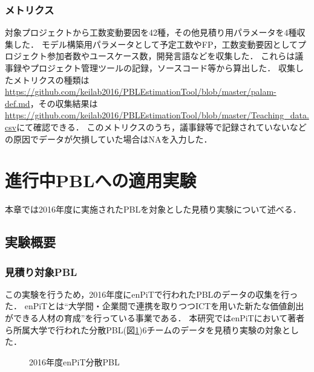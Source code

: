 \documentclass{compsoft}
\begin{document}
\subsubsection{メトリクス} \label{metrix}
対象プロジェクトから工数変動要因を42種，その他見積り用パラメータを4種収集した．
モデル構築用パラメータとして予定工数やFP，工数変動要因としてプロジェクト参加者数やユースケース数，開発言語などを収集した．
これらは議事録やプロジェクト管理ツールの記録，ソースコード等から算出した．
収集したメトリクスの種類は\url{https://github.com/keilab2016/PBLEstimationTool/blob/master/palam-def.md}，その収集結果は\url{https://github.com/keilab2016/PBLEstimationTool/blob/master/Teaching_data.csv}にて確認できる．
このメトリクスのうち，議事録等で記録されていないなどの原因でデータが欠損していた場合はNAを入力した．

\section{進行中PBLへの適用実験} \label{enPiT-PBL}
本章では2016年度に実施されたPBLを対象とした見積り実験について述べる．

\subsection{実験概要} \label{enPiT-exp-summary}

\subsubsection{見積り対象PBL} \label{enPiT-PBL-detail}
この実験を行うため，2016年度にenPiTで行われたPBLのデータの収集を行った．
enPiTとは``大学間・企業間で連携を取りつつICTを用いた新たな価値創出ができる人材の育成''を行っている事業である\cite{enPiT2016}．
本研究ではenPiTにおいて著者ら所属大学で行われた分散PBL(図\ref{fig:enPiT})6チームのデータを見積り実験の対象とした．

\begin{figure}[tb]
\begin{center}
\end{center}
\caption{2016年度enPiT分散PBL}
\label{fig:enPiT}
\end{figure}
\end{document}
